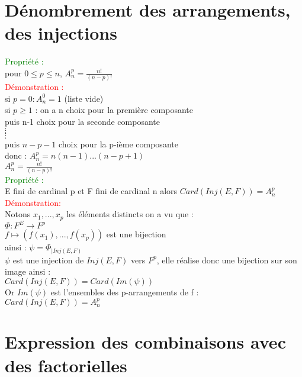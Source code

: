 \documentclass{article}
\begin{document}
\section{Dénombrement des arrangements, des injections}
\textcolor{green}{Propriété : } \\
pour $0 \leq p \leq n $, $A_n^p=\frac{n!}{(n-p)!}$ \\
\textcolor{red}{Démonstration :} \\
si $p=0: A_n^0=1$ (liste vide) \\
si $p \geq 1$ : on a n choix pour la première composante \\
puis n-1 choix pour la seconde composante \\
$\vdots$ \\
$\vdots$ \\
puis $n-p-1$ choix pour la p-ième composante \\
donc : $A_n^p=n(n-1)...(n-p+1)$ \\
$A_n^p=\frac{n!}{(n-p)!}$ \\
\textcolor{green}{Propriété :} \\
E fini de cardinal p et F fini de cardinal n alors $Card(Inj(E,F))=A_n^p$ \\
\textcolor{red}{Démonstration: } \\
Notons $x_1,...,x_p$ les éléments distincts on a vu que : \\
$\Phi : F^E \rightarrow F^p$ \\
$f \mapsto (f(x_1),...,f(x_p))$ est une bijection \\
ainsi : $\psi=\Phi_{|Inj(E,F)} $ \\
$\psi$ est une injection de $Inj(E,F)$ vers $F^p$, elle réalise donc une bijection sur son image ainsi : \\
$Card(Inj(E,F))=Card(Im(\psi))$ \\
Or $Im(\psi)$ est l'ensembles des p-arrangements de f : \\
$Card(Inj(E,F))=A_n^p$ 
\section{Expression des combinaisons avec des factorielles}
\end{document}
